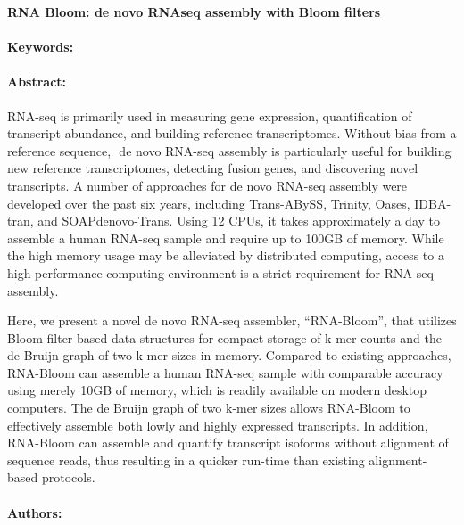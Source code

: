 \noindent
\large {\bf RNA Bloom: de novo RNAseq assembly with Bloom filters} 


\normalsize 


\noindent \paragraph{Keywords:} 

\noindent \paragraph{Abstract:} 

RNA-seq  is  primarily  used  in  measuring  gene  expression,  quantification  of  transcript 
abundance,  and   building  reference  transcriptomes.  Without  bias  from  a  reference  sequence,  ​
de 
novo  RNA-seq  assembly  is  particularly   useful  for  building  new  reference  transcriptomes, 
detecting  fusion  genes,  and  discovering  novel  transcripts.  A  number  of  approaches  for  de  novo 
RNA-seq  assembly  were  developed  over  the  past  six  years,  including  Trans-ABySS,  Trinity, 
Oases,  IDBA-tran,  and  SOAPdenovo-Trans.  Using  12  CPUs,  it  takes  approximately  a  day  to 
assemble  a  human  RNA-seq  sample  and  require  up  to  100GB  of  memory.  While  the  high 
memory  usage  may  be  alleviated  by  distributed  computing,  access  to  a  high-performance 
computing environment is a strict requirement for RNA-seq assembly. 

Here,  we  present  a  novel  de  novo  RNA-seq  assembler,  ``RNA-Bloom'',  that  utilizes 
Bloom  filter-based  data  structures  for  compact  storage  of  k-mer  counts  and  the  de  Bruijn  graph 
of  two  k-mer  sizes  in  memory.  Compared  to  existing  approaches,  RNA-Bloom  can  assemble  a 
human  RNA-seq  sample  with  comparable  accuracy  using  merely  10GB  of  memory,  which  is 
readily  available  on  modern  desktop  computers.  The  de  Bruijn  graph  of  two  k-mer  sizes  allows 
RNA-Bloom  to  effectively   assemble  both  lowly  and  highly  expressed  transcripts.  In  addition, 
RNA-Bloom  can assemble and quantify transcript isoforms without alignment of sequence reads, 
thus resulting in a quicker run-time than existing alignment-based protocols.  
 

\noindent \paragraph{Authors:} 

